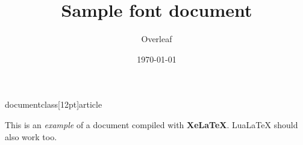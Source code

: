 documentclass[12pt]{article}
\usepackage{fontspec}
 
\setmainfont{Times New Roman}
\title{Sample font document}
\author{Overleaf}
\date{\today}
   

\maketitle
     
This is an \textit{example} of a document compiled 
with \textbf{XeLaTeX}. LuaLaTeX should also work too.


